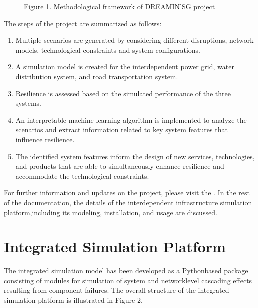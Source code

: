 \documentclass[letterpaper,10pt,english]{sphinxmanual}
\begin{document}
\begin{figure}[htbp]
\centering
\capstart

\noindent{}
\caption{Figure 1. Methodological framework of DREAMIN’SG project}\label{\detokenize{intro:id1}}\end{figure}

\sphinxAtStartPar
The steps of the project are summarized as follows:
\begin{enumerate}
%
\item {} 
\sphinxAtStartPar
Multiple scenarios are generated by considering different disruptions, network models, technological constraints and system configurations.

\item {} 
\sphinxAtStartPar
A simulation model is created for the interdependent power grid, water distribution system, and road transportation system.

\item {} 
\sphinxAtStartPar
Resilience is assessed based on the simulated performance of the three systems.

\item {} 
\sphinxAtStartPar
An interpretable machine learning algorithm is implemented to analyze the scenarios and extract information related to key system features that influence resilience.

\item {} 
\sphinxAtStartPar
The identified system features inform the design of new services, technologies, and prod\sphinxhyphen{}ucts that are able to simultaneously enhance resilience and accommodate the technological constraints.

\end{enumerate}

\sphinxAtStartPar
For further information and updates on the project, please visit the
.
In the rest of the documentation, the details of the interdependent infrastructure
simulation platform,including its modeling, installation, and usage are
discussed.


\chapter{Integrated Simulation Platform}
\label{\detokenize{model:integrated-simulation-platform}}\label{\detokenize{model::doc}}
\sphinxAtStartPar
The integrated simulation model has been developed as a Python\sphinxhyphen{}based package consisting of modules for simulation of system\sphinxhyphen{} and network\sphinxhyphen{}level
cascading effects resulting from component failures. The overall structure of the integrated simulation platform is illustrated in Figure 2.
\end{document}
